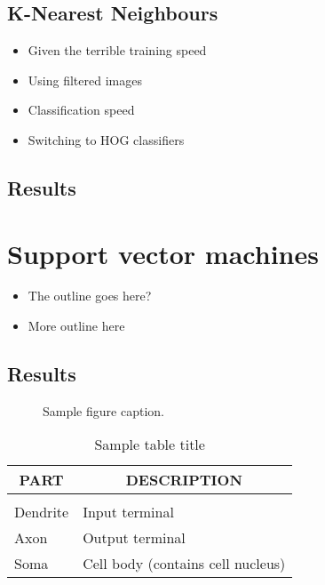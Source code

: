 \documentclass{article} %
\begin{document}
    \subsection{K-Nearest Neighbours} %
    \label{sub:K-Nearest Neighbours}
        \begin{itemize}
            \item Given the terrible training speed
            \item Using filtered images
            \item Classification speed
            \item Switching to HOG classifiers
        \end{itemize}

    \subsection{Results} %
    \label{sub:Results}
    

\section{Support vector machines}
    \begin{itemize}
        \item The outline goes here?
        \item More outline here
    \end{itemize}

    \subsection{Results} %
    \label{sub:Results}
    

\begin{figure}[h]
\begin{center}
\fbox{\rule[-.5cm]{0cm}{4cm} \rule[-.5cm]{4cm}{0cm}}
\end{center}
\caption{Sample figure caption.}
\end{figure}

\begin{table}[t]
    \caption{Sample table title}
    \begin{center}
        \begin{tabular}{ll}
        \multicolumn{1}{c}{\bf PART}  &\multicolumn{1}{c}{\bf DESCRIPTION}
        \\ \hline \\
        Dendrite         &Input terminal \\
        Axon             &Output terminal \\
        Soma             &Cell body (contains cell nucleus) \\
        \end{tabular}
    \end{center}
\end{table}
\end{document}
